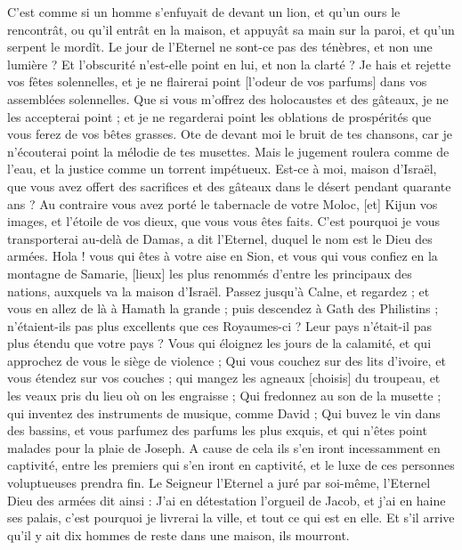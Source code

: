 \begin{multicols}{2}
C'est comme si un homme s'enfuyait de devant un lion, et qu'un ours le rencontrât, ou qu'il entrât en la maison, et appuyât sa main sur la paroi, et qu'un serpent le mordît.
Le jour de l'Eternel ne sont-ce pas des ténèbres, et non une lumière ? Et l'obscurité n'est-elle point en lui, et non la clarté ?
Je hais et rejette vos fêtes solennelles, et je ne flairerai point [l'odeur de vos parfums] dans vos assemblées solennelles.
Que si vous m'offrez des holocaustes et des gâteaux, je ne les accepterai point ; et je ne regarderai point les oblations de prospérités que vous ferez de vos bêtes grasses.
Ote de devant moi le bruit de tes chansons, car je n'écouterai point la mélodie de tes musettes.
Mais le jugement roulera comme de l'eau, et la justice comme un torrent impétueux.
Est-ce à moi, maison d'Israël, que vous avez offert des sacrifices et des gâteaux dans le désert pendant quarante ans ?
Au contraire vous avez porté le tabernacle de votre Moloc, [et] Kijun vos images, et l'étoile de vos dieux, que vous vous êtes faits.
C'est pourquoi je vous transporterai au-delà de Damas, a dit l'Eternel, duquel le nom est le Dieu des armées.
\VerseOne{}Hola ! vous qui êtes à votre aise en Sion, et vous qui vous confiez en la montagne de Samarie, [lieux] les plus renommés d'entre les principaux des nations, auxquels va la maison d'Israël.
Passez jusqu'à Calne, et regardez ; et vous en allez de là à Hamath la grande ; puis descendez à Gath des Philistins ; n'étaient-ils pas plus excellents que ces Royaumes-ci ? Leur pays n'était-il pas plus étendu que votre pays ?
Vous qui éloignez les jours de la calamité, et qui approchez de vous le siège de violence ;
Qui vous couchez sur des lits d'ivoire, et vous étendez sur vos couches ; qui mangez les agneaux [choisis] du troupeau, et les veaux pris du lieu où on les engraisse ;
Qui fredonnez au son de la musette ; qui inventez des instruments de musique, comme David ;
Qui buvez le vin dans des bassins, et vous parfumez des parfums les plus exquis, et qui n'êtes point malades pour la plaie de Joseph.
A cause de cela ils s'en iront incessamment en captivité, entre les premiers qui s'en iront en captivité, et le luxe de ces personnes voluptueuses prendra fin.
Le Seigneur l'Eternel a juré par soi-même, l'Eternel Dieu des armées dit ainsi : J'ai en détestation l'orgueil de Jacob, et j'ai en haine ses palais, c'est pourquoi je livrerai la ville, et tout ce qui est en elle.
Et s'il arrive qu'il y ait dix hommes de reste dans une maison, ils mourront.

\end{multicols}
